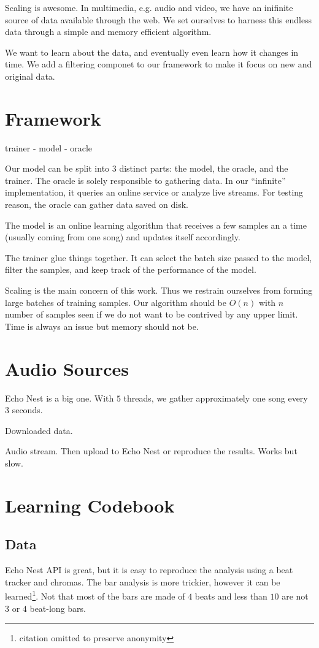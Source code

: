 \documentclass{sig-alternate}
\begin{document}
Scaling is awesome. In multimedia, e.g. audio and video, we have an
inifinite source of data available through the web. We set ourselves
to harness this endless data through a simple and memory efficient
algorithm.

We want to learn about the data, and eventually even learn how it
changes in time. We add a filtering componet to our framework
to make it focus on new and original data.


\section{Framework}
trainer - model - oracle

Our model can be split into $3$ distinct parts: the model, the oracle,
and the trainer. The oracle is solely responsible to gathering data.
In our ``infinite'' implementation, it queries an online service or
analyze live streams. For testing reason, the oracle can gather data
saved on disk.

The model is an online learning algorithm that receives a few samples
an a time (usually coming from one song) and updates itself accordingly.

The trainer glue things together. It can select the batch size passed
to the model, filter the samples, and keep track of the performance of
the model.

Scaling is the main concern of this work. Thus we restrain ourselves
from forming large batches of training samples. Our algorithm should be
$O(n)$ with $n$ number of samples seen if we do not want to be contrived
by any upper limit. Time is always an issue but memory should not be.


\section{Audio Sources}
Echo Nest is a big one. With $5$ threads, we gather approximately one song
every $3$ seconds.

Downloaded data.

Audio stream. Then upload to Echo Nest or reproduce the results. Works
but slow.

\section{Learning Codebook}

\subsection{Data}
Echo Nest API \cite{EchoNest} is great, but it is easy to reproduce
the analysis using a beat tracker and chromas. The bar analysis is
more trickier, however it can be learned\footnote{citation omitted to preserve 
anonymity}. Not that most of the bars are made of $4$ beats and less
than $10$ are not $3$ or $4$ beat-long bars.
\end{document}
